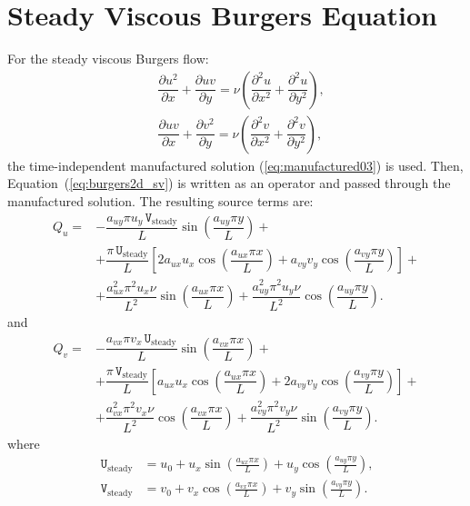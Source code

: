 \documentclass[10pt]{article}
\newcommand{\diff}[2] {\dfrac{\partial #1}{\partial #2}}
\newcommand{\U}{\,\mathtt{U}}
\newcommand{\V}{\,\mathtt{V}}
\begin{document}
\section{Steady Viscous Burgers Equation}
For the steady viscous Burgers flow:
\begin{equation}
 \label{eq:burgers2d_sv}
\begin{split}
& \diff{ u^2 }{x}+\diff{uv}{y}=\nu \left( \diff{^2u}{ x^2}+ \diff{^2u }{y^2}\right),\\
 &\diff{ u v}{x} + \diff{  v^2 }{y}=\nu \left( \diff{^2v}{ x^2}+ \diff{^2v }{y^2}\right),
\end{split}
\end{equation}
the  time-independent  manufactured solution (\ref{eq:manufactured03}) is used. Then, Equation~(\ref{eq:burgers2d_sv}) is written as an  operator and passed through the manufactured solution. The resulting source terms are:
\begin{equation}
\begin{split}
Q_u = &-\dfrac{a_{uy} \pi u_y \V_\text{steady} }{L}\sin\left(\dfrac{a_{uy} \pi y}{L}\right)+\\
 &+\dfrac{\pi \U_\text{steady}}{L}\left[2 a_{ux} u_x \cos\left(\dfrac{a_{ux} \pi x}{L}\right)+a_{vy} v_y \cos\left(\dfrac{a_{vy} \pi y}{L}\right)\right] +\\
 &+ \dfrac{a_{ux}^2 \pi^2 u_x \nu}{L^2}\sin\left(\dfrac{a_{ux} \pi x}{L}\right)+ \dfrac{a_{uy}^2 \pi^2 u_y \nu}{L^2}\cos\left(\dfrac{a_{uy} \pi y}{L}\right).
\end{split}
 \end{equation}
and
\begin{equation}
\begin{split}
Q_v = &-\dfrac{a_{vx} \pi v_x \U_\text{steady} }{L}\sin\left(\dfrac{a_{vx} \pi x}{L}\right)+\\
 &+\dfrac{\pi \V_\text{steady}}{L}\left[a_{ux} u_x \cos\left(\dfrac{a_{ux} \pi x}{L}\right)+2 a_{vy} v_y \cos\left(\dfrac{a_{vy} \pi y}{L}\right)\right] +\\
 &+\dfrac{a_{vx}^2 \pi^2 v_x \nu }{L^2}\cos\left(\dfrac{a_{vx} \pi x}{L}\right)+\dfrac{a_{vy}^2 \pi^2 v_y \nu }{L^2}\sin\left(\dfrac{a_{vy} \pi y}{L}\right).
\end{split}
\end{equation}
where
\begin{equation}
 \begin{split} \label{aux_var_steady}
  \U_\text{steady} &= u_{0}+u_{x} \sin\left(\frac{a_{u x} \pi x}{L}\right)+u_{y} \cos\left(\frac{a_{u y} \pi y}{L}\right),\\
\V_\text{steady} &= v_{0}+v_{x} \cos\left(\frac{a_{v x} \pi x}{L}\right)+v_{y} \sin\left(\frac{a_{v y} \pi y}{L}\right).
 \end{split}
\end{equation}
\end{document}
